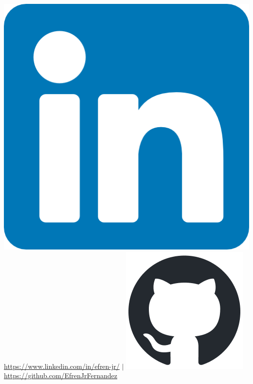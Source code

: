 \documentclass[a4paper,20pt]{article}
\begin{document}
\begin{center}
    \includegraphics[scale = 0.02]{images/linkedin_logo.png} \href{https://www.linkedin.com/in/efren-jr/}{https://www.linkedin.com/in/efren-jr/} $\vert$ 
    \includegraphics[scale = 0.15]{images/github-mark.png}
    \href{https://github.com/EfrenJrFernandez}{https://github.com/EfrenJrFernandez}
    
\end{center}


\end{document}
